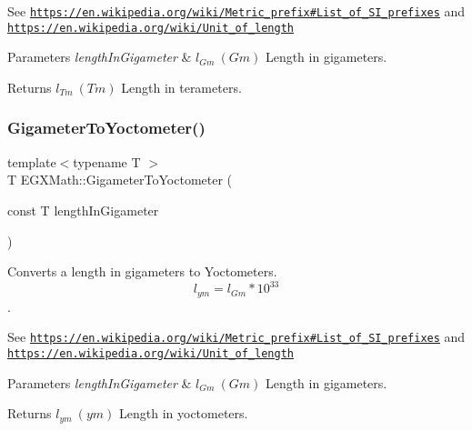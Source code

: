 See \href{https://en.wikipedia.org/wiki/Metric_prefix#List_of_SI_prefixes}{\tt https\+://en.\+wikipedia.\+org/wiki/\+Metric\+\_\+prefix\#\+List\+\_\+of\+\_\+\+S\+I\+\_\+prefixes} and \href{https://en.wikipedia.org/wiki/Unit_of_length}{\tt https\+://en.\+wikipedia.\+org/wiki/\+Unit\+\_\+of\+\_\+length} 
\begin{DoxyParams}{Parameters}
{\em length\+In\+Gigameter} & $ l_{Gm}\ (Gm)$ Length in gigameters. \\
\hline
\end{DoxyParams}
\begin{DoxyReturn}{Returns}
$ l_{Tm}\ (Tm)$ Length in terameters. 
\end{DoxyReturn}
\mbox{\label{group___e_g_x_math-_conversions-_length_conversions-_gigameter-_s_i_ga2eff69e0a00032c24617fde4ac30bd49}} 
\subsubsection{\texorpdfstring{Gigameter\+To\+Yoctometer()}{GigameterToYoctometer()}}
{\footnotesize\ttfamily template$<$typename T $>$ \\
T E\+G\+X\+Math\+::\+Gigameter\+To\+Yoctometer (\begin{DoxyParamCaption}\item[{const T}]{length\+In\+Gigameter }\end{DoxyParamCaption})}



Converts a length in gigameters to Yoctometers. \[ l_{ym}=l_{Gm} * 10^{33} \]. 

See \href{https://en.wikipedia.org/wiki/Metric_prefix#List_of_SI_prefixes}{\tt https\+://en.\+wikipedia.\+org/wiki/\+Metric\+\_\+prefix\#\+List\+\_\+of\+\_\+\+S\+I\+\_\+prefixes} and \href{https://en.wikipedia.org/wiki/Unit_of_length}{\tt https\+://en.\+wikipedia.\+org/wiki/\+Unit\+\_\+of\+\_\+length} 
\begin{DoxyParams}{Parameters}
{\em length\+In\+Gigameter} & $ l_{Gm}\ (Gm)$ Length in gigameters. \\
\hline
\end{DoxyParams}
\begin{DoxyReturn}{Returns}
$ l_{ym}\ (ym)$ Length in yoctometers. 
\end{DoxyReturn}
\mbox{\label{group___e_g_x_math-_conversions-_length_conversions-_gigameter-_s_i_ga311d6ae40f97487de660c9fb0310ec5e}} 
